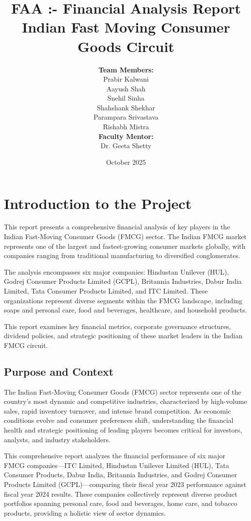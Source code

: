 \documentclass[12pt, a4paper]{report}
\title{\textbf{FAA :- Financial Analysis Report} \\ \vspace{0.5cm} \Large Indian Fast Moving Consumer Goods Circuit}
\author{
    \textbf{Team Members:} \\
    \vspace{0.3cm}
    Prabir Kalwani \\
    Aayush Shah \\
    Snehil Sinha \\
    Shahshank Shekhar \\
    Parampara Srivastava \\
    Rishabh Mistra \\
    \vspace{0.8cm}
    \textbf{Faculty Mentor:} \\
    Dr. Geeta Shetty
}
\date{October 2025}
\begin{document}
\maketitle

\newpage
\tableofcontents
\newpage

\chapter{Introduction to the Project}

This report presents a comprehensive financial analysis of key players in the Indian Fast-Moving Consumer Goods (FMCG) sector. The Indian FMCG market represents one of the largest and fastest-growing consumer markets globally, with companies ranging from traditional manufacturing to diversified conglomerates.

The analysis encompasses six major companies: Hindustan Unilever (HUL), Godrej Consumer Products Limited (GCPL), Britannia Industries, Dabur India Limited, Tata Consumer Products Limited, and ITC Limited. These organizations represent diverse segments within the FMCG landscape, including soaps and personal care, food and beverages, healthcare, and household products.

This report examines key financial metrics, corporate governance structures, dividend policies, and strategic positioning of these market leaders in the Indian FMCG circuit.

\section{Purpose and Context}

The Indian Fast-Moving Consumer Goods (FMCG) sector represents one of the country's most dynamic and competitive industries, characterized by high-volume sales, rapid inventory turnover, and intense brand competition. As economic conditions evolve and consumer preferences shift, understanding the financial health and strategic positioning of leading players becomes critical for investors, analysts, and industry stakeholders.

This comprehensive report analyzes the financial performance of six major FMCG companies---ITC Limited, Hindustan Unilever Limited (HUL), Tata Consumer Products, Dabur India, Britannia Industries, and Godrej Consumer Products Limited (GCPL)---comparing their fiscal year 2023 performance against fiscal year 2024 results. These companies collectively represent diverse product portfolios spanning personal care, food and beverages, home care, and tobacco products, providing a holistic view of sector dynamics.
\end{document}
